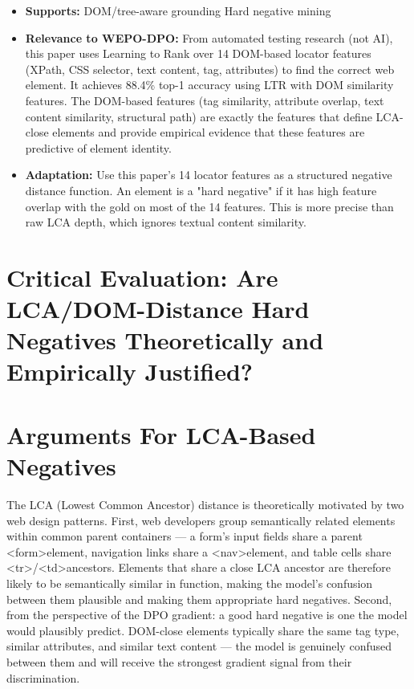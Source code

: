 \documentclass[pdflatex,sn-mathphys-num]{sn-jnl}
\theoremstyle{thmstyleone}
\theoremstyle{thmstyletwo}
\theoremstyle{thmstylethree}
\begin{document}
\begin{itemize}
    \item \textbf{Supports:} \checkmark DOM/tree-aware grounding \checkmark Hard negative mining
    \item \textbf{Relevance to WEPO-DPO:} From automated testing research (not AI), this paper uses Learning to Rank over 14 DOM-based locator features (XPath, CSS selector, text content, tag, attributes) to find the correct web element. It achieves 88.4\% top-1 accuracy using LTR with DOM similarity features. The DOM-based features (tag similarity, attribute overlap, text content similarity, structural path) are exactly the features that define LCA-close elements and provide empirical evidence that these features are predictive of element identity.
    \item \textbf{Adaptation:} Use this paper's 14 locator features as a structured negative distance function. An element is a "hard negative" if it has high feature overlap with the gold on most of the 14 features. This is more precise than raw LCA depth, which ignores textual content similarity.
\end{itemize}

\section{Critical Evaluation: Are LCA/DOM-Distance Hard Negatives Theoretically and Empirically Justified?}

\section{Arguments For LCA-Based Negatives}
The LCA (Lowest Common Ancestor) distance is theoretically motivated by two web design patterns. First, web developers group semantically related elements within common parent containers --- a form's input fields share a parent \textless form\textgreater element, navigation links share a \textless nav\textgreater element, and table cells share \textless tr\textgreater/\textless td\textgreater ancestors. Elements that share a close LCA ancestor are therefore likely to be semantically similar in function, making the model's confusion between them plausible and making them appropriate hard negatives. Second, from the perspective of the DPO gradient: a good hard negative is one the model would plausibly predict. DOM-close elements typically share the same tag type, similar attributes, and similar text content --- the model is genuinely confused between them and will receive the strongest gradient signal from their discrimination.
\end{document}
